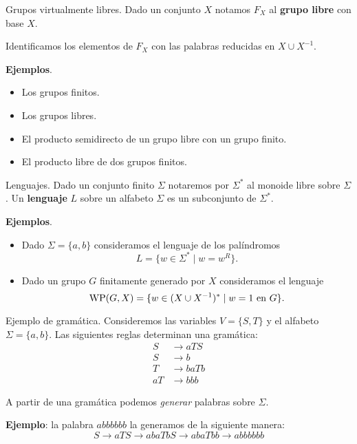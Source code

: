 \documentclass[aspectratio=169, 10pt]{beamer}
\begin{document}
	\begin{frame}[fragile]{Grupos virtualmente libres.}
		\onslide<+->
		Dado un conjunto $X$ notamos $F_{X}$ al \textbf{grupo libre} con base $X$.

		\onslide<+->
		Identificamos los elementos de $F_{X}$ con las palabras reducidas en $X \cup X^{-1}$.
		
		\onslide<+->
			\onslide<+->
			\textbf{Ejemplos}.
				\begin{itemize}
					\item Los grupos finitos.
					\item \pause Los grupos libres.
					\item \pause El producto semidirecto de un grupo libre con un grupo finito.
					\item \pause El producto libre de dos grupos finitos.
				\end{itemize}
	\end{frame}

	\begin{frame}[fragile]{Lenguajes.}
		Dado un conjunto finito $\Sigma$ notaremos por $\Sigma^*$ al monoide libre sobre $\Sigma$.
		\pause 
		Un \textbf{lenguaje} $L$ sobre un alfabeto $\Sigma$ es un subconjunto de $\Sigma^*$.
		\pause 	

			\textbf{Ejemplos}.


			\begin{itemize}
				\item 
					Dado $\Sigma = \{a,b\}$ consideramos el lenguaje de los palíndromos
					\[
						L = \{ w \in \Sigma^{*} \mid w = w^{R}  \}.
					\]
				\item \pause 
					Dado un grupo $G$ finitamente generado por $X$ consideramos el lenguaje
					\[
						\text{WP}(G, X) = \{ w \in (X \cup X^{-1})^{*} \mid w = 1 \ \text{en $G$} \}.	
					\]
			\end{itemize}
	\end{frame}
	
	\begin{frame}[fragile]{Ejemplo de gramática.}
		Consideremos las variables $V =\{ S,T \}$ y el alfabeto $\Sigma = \{ a,b \}$.
		\pause 
		Las siguientes reglas determinan una gramática:
		\begin{align*}
			S  & \to aTS  \\
			S  & \to b    \\
			T  & \to baTb \\
			aT & \to bbb
		\end{align*}

		\pause 

		A partir de una gramática podemos \emph{generar} palabras sobre $\Sigma$.

		\pause 
		\textbf{Ejemplo}: la palabra $abbbbbb$ la generamos de la siguiente manera:  
		\[
			S \to aTS \to abaTbS \to abaTbb \to abbbbbb	
		\]
	\end{frame}
\end{document}
